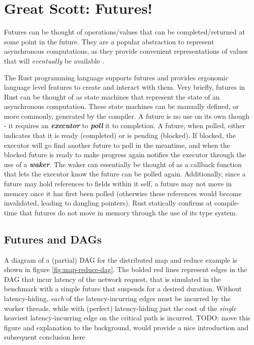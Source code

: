 \documentclass[bsc,frontabs,singlespacing,parskip,deptreport,normalheadings]{infthesis}
\begin{document}
\section{Great Scott: Futures!}
\label{section:futures}

Futures can be thought of operations/values that can be completed/returned at
some point in the future. They are a popular abstraction to represent
asynchronous computations, as they provide convenient representations of values
that will \textit{eventually} be available \cite{halstead_implementation_1984,
halstead_multilisp_1985}.

The Rust programming language supports futures and provides ergonomic language
level features to create and interact with them. Very briefly, futures in Rust
can be thought of as state machines that represent the state of an asynchronous
computation. These state machines can be manually defined, or more commonly,
generated by the compiler. A future is no use on its own though - it requires an
\textit{\textbf{executor}} to \textbf{\textit{poll}} it to completion. A future,
when polled, either indicates that it is ready (completed) or is pending
(blocked). If blocked, the executor will go find another future to poll in the
meantime, and when the blocked future is ready to make progress again notifies
the executor through the use of a \textbf{\textit{waker}}. The waker can
essentially be thought of as a callback function that lets the executor know the
future can be polled again. Additionally, since a future may hold references to
fields within it self, a future may not move in memory once it has first been
polled (otherwise these references would become invalidated, leading to dangling
pointers). Rust statically confirms at compile-time that futures do not move in
memory through the use of its type system.

\subsection{Futures and DAGs}

A diagram of a (partial) DAG for the distributed map and reduce example is shown
in figure \ref{fig:map-reduce-dag}. The bolded red lines represent edges in the
DAG that incur latency of the network request, that is simulated in the
benchmark with a simple future that suspends for a desired duration. Without
latency-hiding, \textit{each} of the latency-incurring edges must be incurred by
the worker threads, while with (perfect) latency-hiding just the cost of the
\textit{single} heaviest latency-incurring edge on the critical path is
incurred. TODO: move this figure and explanation to the background, would
provide a nice introduction and subsequent conclusion here
\end{document}
